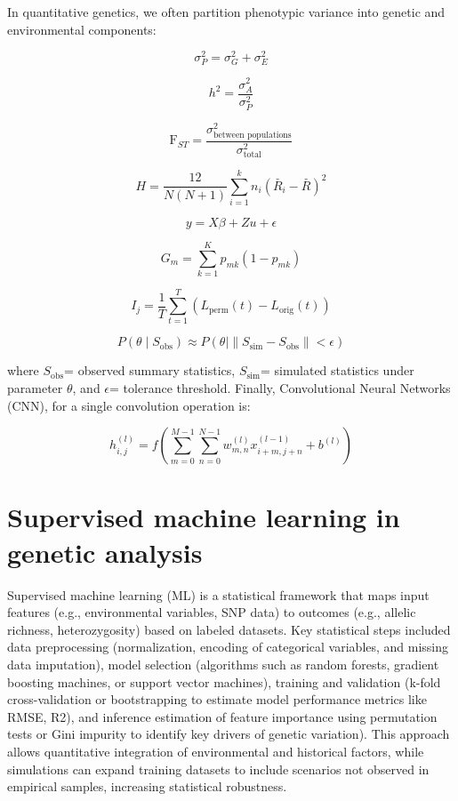 \documentclass[
]{article}
\begin{document}
In quantitative genetics, we often partition phenotypic variance into
genetic and environmental components:

\[\sigma_{P}^{2} = \sigma_{G}^{2} + \sigma_{E}^{2}
\]

\[h^{2} = \frac{\sigma_{A}^{2}}{\sigma_{P}^{2}}
\]

\[\text{F}_{ST} = \frac{\sigma_{\text{between~populations}}^{2}}{\sigma_{\text{total}}^{2}}
\]

\[H = \frac{12}{N(N + 1)}\sum_{i = 1}^{k}n_{i}({\overset{ˉ}{R}}_{i} - \overset{ˉ}{R})^{2}
\]

\[y = X\beta + Zu + \epsilon
\]

\[G_{m} = \sum_{k = 1}^{K}p_{mk}(1 - p_{mk})
\]

\[I_{j} = \frac{1}{T}\sum_{t = 1}^{T}(L_{\text{perm}}(t) - L_{\text{orig}}(t))
\]

\[P(\theta \mid S_{\text{obs}}) \approx P(\theta \mid \parallel S_{\text{sim}} - S_{\text{obs}} \parallel < \epsilon)
\]

where \(S_{\text{obs}}\)= observed summary statistics,
\(S_{\text{sim}}\)= simulated statistics under parameter \(\theta\), and
\(\epsilon\)= tolerance threshold. Finally, Convolutional Neural
Networks (CNN), for a single convolution operation is:

\[h_{i,j}^{(l)} = f(\sum_{m = 0}^{M - 1}{\sum_{n = 0}^{N - 1}w_{m,n}^{(l)}}x_{i + m,j + n}^{\left( l-1 \right)} + b^{(l)})
\]

\hypertarget{supervised-machine-learning-in-genetic-analysis}{%
\section{Supervised machine learning in genetic
analysis}\label{supervised-machine-learning-in-genetic-analysis}}

Supervised machine learning (ML) is a statistical framework that maps
input features (e.g., environmental variables, SNP data) to outcomes
(e.g., allelic richness, heterozygosity) based on labeled datasets. Key
statistical steps included data preprocessing (normalization, encoding
of categorical variables, and missing data imputation), model selection
(algorithms such as random forests, gradient boosting machines, or
support vector machines), training and validation (k-fold
cross-validation or bootstrapping to estimate model performance metrics
like RMSE, R2), and inference estimation of feature importance using
permutation tests or Gini impurity to identify key drivers of genetic
variation). This approach allows quantitative integration of
environmental and historical factors, while simulations can expand
training datasets to include scenarios not observed in empirical
samples, increasing statistical robustness.
\end{document}
